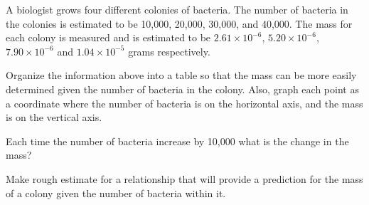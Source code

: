 
\begin{problem}
\item A biologist grows four different colonies of bacteria. The
  number of bacteria in the colonies is estimated to be 10,000,
  20,000, 30,000, and 40,000. The mass for each colony is measured and
  is estimated to be $2.61\times 10^{-6}$, $5.20\times 10^{-6}$,
  $7.90\times 10^{-6}$ and $1.04\times 10^{-5}$ grams respectively.

  Organize the information above into a table so that the mass can be
  more easily determined given the number of bacteria in the
  colony. Also, graph each point as a coordinate where the number of
  bacteria is on the horizontal axis, and the mass is on the vertical
  axis. 

  \vfill

\item Each time the number of bacteria increase by 10,000 what is the
  change in the mass?

  \vfill

\item Make rough estimate for a relationship that will provide a
  prediction for the mass of a colony given the number of bacteria
  within it.

  \vfill


  \vspace{5em}


\end{problem}


